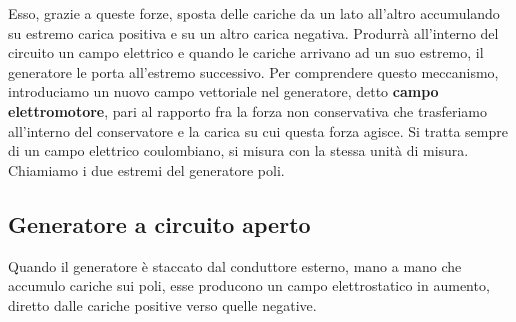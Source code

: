 Esso, grazie a queste forze, sposta delle cariche da un lato all'altro accumulando su estremo carica positiva e su un altro carica negativa. Produrrà all'interno del circuito un campo elettrico e quando le cariche arrivano ad un suo estremo, il generatore le porta all'estremo successivo. Per comprendere questo meccanismo, introduciamo un nuovo campo vettoriale nel generatore, detto \textbf{campo elettromotore}, pari al rapporto fra la forza non conservativa che trasferiamo all'interno del conservatore e la carica su cui questa forza agisce. Si tratta sempre di un campo elettrico coulombiano, si misura con la stessa unità di misura. Chiamiamo i due estremi del generatore poli.

\subsection{Generatore a circuito aperto}

Quando il generatore è staccato dal conduttore esterno, mano a mano che accumulo cariche sui poli, esse producono un campo elettrostatico in aumento, diretto dalle cariche positive verso quelle negative.

